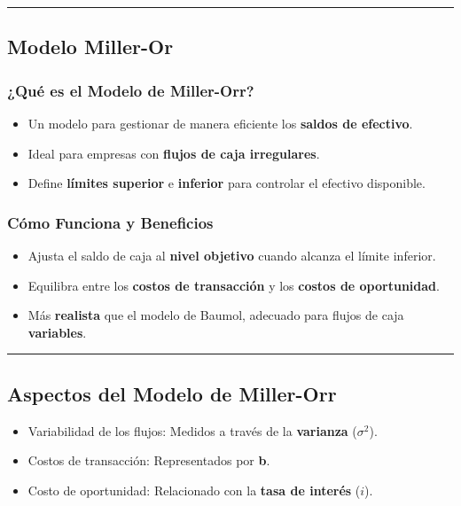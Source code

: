 \documentclass[
  letterpaper,
  DIV=11,
  numbers=noendperiod]{scrartcl}
\providecommand{\tightlist}{%
  \setlength{\itemsep}{0pt}\setlength{\parskip}{0pt}}\usepackage{longtable,booktabs,array}
\begin{document}
\begin{center}\rule{0.5\linewidth}{0.5pt}\end{center}

\subsection{Modelo Miller-Or}\label{modelo-miller-or}

\subsubsection{¿Qué es el Modelo de
Miller-Orr?}\label{quuxe9-es-el-modelo-de-miller-orr}

\begin{itemize}
\tightlist
\item
  Un modelo para gestionar de manera eficiente los \textbf{saldos de
  efectivo}.
\item
  Ideal para empresas con \textbf{flujos de caja irregulares}.
\item
  Define \textbf{límites superior} e \textbf{inferior} para controlar el
  efectivo disponible.
\end{itemize}

\subsubsection{Cómo Funciona y
Beneficios}\label{cuxf3mo-funciona-y-beneficios}

\begin{itemize}
\tightlist
\item
  Ajusta el saldo de caja al \textbf{nivel objetivo} cuando alcanza el
  límite inferior.
\item
  Equilibra entre los \textbf{costos de transacción} y los
  \textbf{costos de oportunidad}.
\item
  Más \textbf{realista} que el modelo de Baumol, adecuado para flujos de
  caja \textbf{variables}.
\end{itemize}

\begin{center}\rule{0.5\linewidth}{0.5pt}\end{center}

\subsection{Aspectos del Modelo de
Miller-Orr}\label{aspectos-del-modelo-de-miller-orr}

\begin{itemize}
\tightlist
\item
  Variabilidad de los flujos: Medidos a través de la \textbf{varianza}
  (\(\sigma^2\)).
\item
  Costos de transacción: Representados por \textbf{b}.
\item
  Costo de oportunidad: Relacionado con la \textbf{tasa de interés}
  (\(i\)).
\end{itemize}
\end{document}
